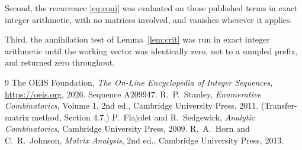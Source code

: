 \documentclass[11pt,a4paper]{article}
\theoremstyle{plain}
\theoremstyle{definition}
\begin{document}
Second, the recurrence \eqref{eq:conj} was evaluated on those published terms in exact
integer arithmetic, with no matrices involved, and vanishes wherever it applies.

Third, the annihilation test of Lemma~\ref{lem:crit} was run in exact integer arithmetic
until the working vector was identically zero, not to a sampled prefix, and returned zero
throughout.

\begin{thebibliography}{9}
 The OEIS Foundation, \emph{The On-Line Encyclopedia of Integer
Sequences}, \url{https://oeis.org}, 2026. Sequence A209947.
 R.~P.~Stanley, \emph{Enumerative Combinatorics}, Volume 1, 2nd ed.,
Cambridge University Press, 2011. (Transfer-matrix method, Section 4.7.)
 P.~Flajolet and R.~Sedgewick, \emph{Analytic Combinatorics}, Cambridge
University Press, 2009.
 R.~A.~Horn and C.~R.~Johnson, \emph{Matrix Analysis}, 2nd ed., Cambridge
University Press, 2013.
\end{thebibliography}
\end{document}
